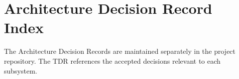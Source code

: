 \chapter{Architecture Decision Record Index}

The Architecture Decision Records are maintained separately in the project repository. The TDR references the accepted decisions relevant to each subsystem.
